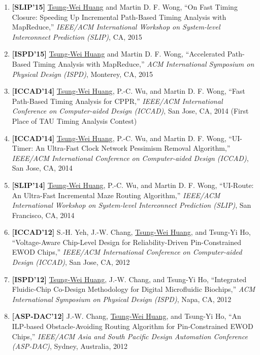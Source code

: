 \documentclass[A4,11pt]{article}
\begin{document}
\begin{enumerate}
    \item \textbf{[SLIP'15]} \underline{Tsung-Wei Huang} and Martin D. F. Wong, ``On Fast Timing Closure: Speeding Up Incremental Path-Based Timing Analysis with MapReduce,'' \textit{IEEE/ACM International Workshop on System-level Interconnect Prediction (SLIP)}, CA, 2015

    \item \textbf{[ISPD'15]} \underline{Tsung-Wei Huang} and Martin D. F. Wong, ``Accelerated Path-Based Timing Analysis with MapReduce,'' \textit{ACM International Symposium on Physical Design (ISPD)}, Monterey, CA, 2015

    \item \textbf{[ICCAD'14]} \underline{Tsung-Wei Huang}, P.-C. Wu, and Martin D. F. Wong, ``Fast Path-Based Timing Analysis for CPPR,'' \textit{IEEE/ACM International Conference on Computer-aided Design (ICCAD)}, San Jose, CA, 2014 (First Place of TAU Timing Analysis Contest)

    \item \textbf{[ICCAD'14]} \underline{Tsung-Wei Huang}, P.-C. Wu, and Martin D. F. Wong, ``UI-Timer: An Ultra-Fast Clock Network Pessimism Removal Algorithm,'' \textit{IEEE/ACM International Conference on Computer-aided Design (ICCAD)}, San Jose, CA, 2014 

    \item \textbf{[SLIP'14]} \underline{Tsung-Wei Huang}, P.-C. Wu, and Martin D. F. Wong, ``UI-Route: An Ultra-Fast Incremental Maze Routing Algorithm,'' \textit{IEEE/ACM International Workshop on System-level Interconnect Prediction (SLIP)}, San Francisco, CA, 2014

    \item \textbf{[ICCAD'12]} S.-H. Yeh, J.-W. Chang, \underline{Tsung-Wei Huang}, and Tsung-Yi Ho, ``Voltage-Aware Chip-Level Design for Reliability-Driven Pin-Constrained EWOD Chips,'' \textit{IEEE/ACM International Conference on Computer-aided Design (ICCAD)}, San Jose, CA, 2012

    \item \textbf{[ISPD'12]} \underline{Tsung-Wei Huang}, J.-W. Chang, and Tsung-Yi Ho, ``Integrated Fluidic-Chip Co-Design Methodology for Digital Microfluidic Biochips,'' \textit{ACM International Symposium on Physical Design (ISPD)}, Napa, CA, 2012

    \item \textbf{[ASP-DAC'12]} J.-W. Chang, \underline{Tsung-Wei Huang}, and Tsung-Yi Ho, ``An ILP-based Obstacle-Avoiding Routing Algorithm for Pin-Constrained EWOD Chips,'' \textit{IEEE/ACM Asia and South Pacific Design Automation Conference (ASP-DAC)}, Sydney, Australia, 2012


\end{enumerate}
\end{document}
